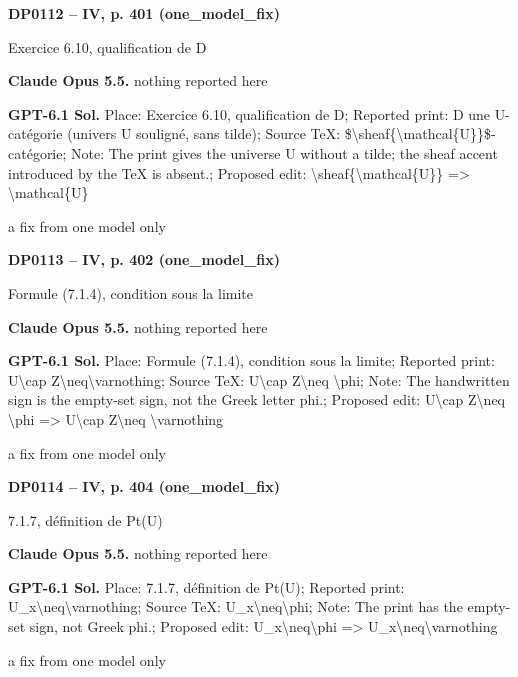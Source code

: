 \par\noindent\hypertarget{DP0112}{}\textbf{DP0112 -- IV, p. 401 (one\_model\_fix)}\par
Exercice 6.10, qualification de D\par
\textbf{Claude Opus 5.5.} nothing reported here\par
\textbf{GPT-6.1 Sol.} Place: Exercice 6.10, qualification de D; Reported print: D une U-catégorie (univers U souligné, sans tilde); Source TeX: \$\textbackslash{}sheaf\{\textbackslash{}mathcal\{U\}\}\$-catégorie; Note: The print gives the universe U without a tilde; the sheaf accent introduced by the TeX is absent.; Proposed edit: \textbackslash{}sheaf\{\textbackslash{}mathcal\{U\}\} =\allowbreak > \textbackslash{}mathcal\{U\}\par
a fix from one model only\par
\par\noindent\hypertarget{DP0113}{}\textbf{DP0113 -- IV, p. 402 (one\_model\_fix)}\par
Formule (7.1.4), condition sous la limite\par
\textbf{Claude Opus 5.5.} nothing reported here\par
\textbf{GPT-6.1 Sol.} Place: Formule (7.1.4), condition sous la limite; Reported print: U\textbackslash{}cap Z\textbackslash{}neq\textbackslash{}varnothing; Source TeX: U\textbackslash{}cap Z\textbackslash{}neq \textbackslash{}phi; Note: The handwritten sign is the empty-set sign, not the Greek letter phi.; Proposed edit: U\textbackslash{}cap Z\textbackslash{}neq \textbackslash{}phi =\allowbreak > U\textbackslash{}cap Z\textbackslash{}neq \textbackslash{}varnothing\par
a fix from one model only\par
\par\noindent\hypertarget{DP0114}{}\textbf{DP0114 -- IV, p. 404 (one\_model\_fix)}\par
7.1.7, définition de Pt(U)\par
\textbf{Claude Opus 5.5.} nothing reported here\par
\textbf{GPT-6.1 Sol.} Place: 7.1.7, définition de Pt(U); Reported print: U\_x\textbackslash{}neq\textbackslash{}varnothing; Source TeX: U\_x\textbackslash{}neq\textbackslash{}phi; Note: The print has the empty-set sign, not Greek phi.; Proposed edit: U\_x\textbackslash{}neq\textbackslash{}phi =\allowbreak > U\_x\textbackslash{}neq\textbackslash{}varnothing\par
a fix from one model only\par
